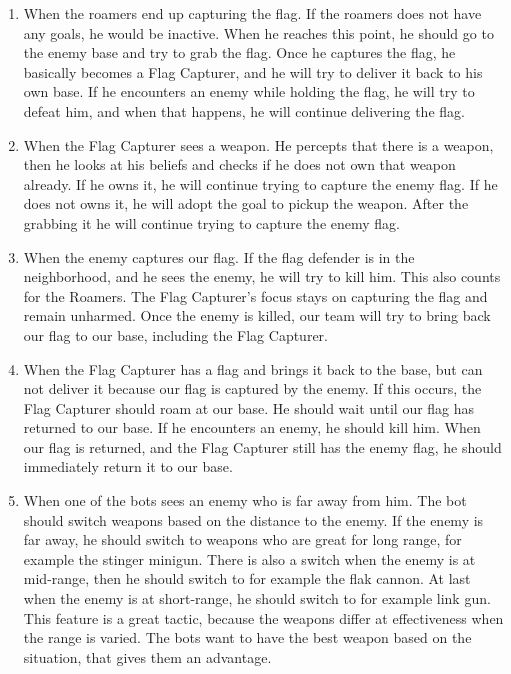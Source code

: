 \begin{enumerate}
	\item When the roamers end up capturing the flag. If the roamers does not have any goals, he would be inactive. When he reaches this point, he should go to the enemy base and try to grab the flag. Once he captures the flag, he basically becomes a Flag Capturer, and he will try to deliver it back to his own base. If he encounters an enemy while holding the flag, he will try to defeat him, and when that happens, he will continue delivering the flag.\\ 
	\item When the Flag Capturer sees a weapon. He percepts that there is a weapon, then he looks at his beliefs and checks if he does not own that weapon already. If he owns it, he will continue trying to capture the enemy flag. If he does not owns it, he will adopt the goal to pickup the weapon. After the grabbing it he will continue trying to capture the enemy flag.\\
	\item When the enemy captures our flag. If the flag defender is in the neighborhood, and he sees the enemy, he will try to kill him. This also counts for the Roamers. The Flag Capturer's focus stays on capturing the flag and remain unharmed. Once the enemy is killed, our team will try to bring back our flag to our base, including the Flag Capturer. \\
	\item When the Flag Capturer has a flag and brings it back to the base, but can not deliver it because our flag is captured by the enemy. If this occurs, the Flag Capturer should roam at our base. He should wait until our flag has returned to our base. If he encounters an enemy, he should kill him. When our flag is returned, and the Flag Capturer still has the enemy flag, he should immediately return it to our base.\\
	\item When one of the bots sees an enemy who is far away from him. The bot should switch weapons based on the distance to the enemy. If the enemy is far away, he should switch to weapons who are great for long range, for example the stinger minigun. There is also a switch when the enemy is at mid-range, then he should switch to for example the flak cannon. At last when the enemy is at short-range, he should switch to for example link gun. This feature is a great tactic, because the weapons differ at effectiveness when the range is varied. The bots want to have the best weapon based on the situation, that gives them an advantage. 
\end{enumerate}